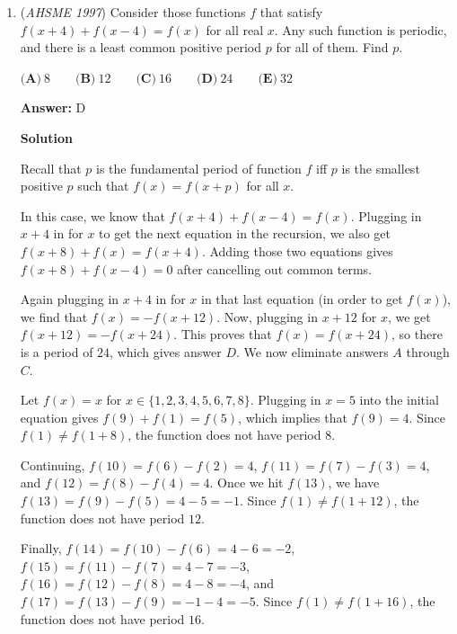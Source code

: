 \begin{enumerate}
\textbf{Solution 2}

Construct the angle bisector of $\angle APD,$ and let it intersect $AD$ at $E.$ From the angle bisector theorem, we have $AE=3a$ and $DE=2a$ for some $a.$ Then, note that $\angle EPD = \angle BCD = x,$ so $EPCB$ is cyclic. Then, $\frac{PD}{ED} = \frac{CD}{BD}$ or $\frac{2}{2x} = \frac{CD}{1}.$ Thus, $AD \cdot DC = 5x \cdot DC = 5,$ or $\boxed{A}.$



	\item (\textit{AHSME 1997}) Consider those functions $f$ that satisfy $f(x+4)+f(x-4) = f(x)$ for all real $x$. Any such function is periodic, and there is a least common positive period $p$ for all of them. Find $p$.


 $\textbf{(A)}\ 8\qquad\textbf{(B)}\ 12\qquad\textbf{(C)}\ 16\qquad\textbf{(D)}\ 24\qquad\textbf{(E)}\ 32$

 \textbf{Answer: }D



\textbf{Solution}

Recall that $p$ is the fundamental period of function $f$ iff $p$ is the smallest positive $p$ such that $f(x) = f(x + p)$ for all $x$.

 
In this case, we know that $f(x+ 4) + f(x - 4) = f(x)$.  Plugging in $x+4$ in for $x$ to get the next equation in the recursion, we also get $f(x + 8) + f(x) = f(x + 4)$.  Adding those two equations gives $f(x + 8) +  f(x - 4) = 0$ after cancelling out common terms.

 
Again plugging in $x + 4$ in for $x$ in that last equation (in order to get $f(x)$), we find that $f(x) = -f(x + 12)$.  Now, plugging in $x+12$ for $x$, we get $f(x + 12) = -f(x + 24)$.  This proves that $f(x)  = f(x + 24)$, so there is a period of $24$, which gives answer $\boxed{D}$.  We now eliminate answers $A$ through $C$.

 
Let $f(x) = x$ for $x \in \{1, 2, 3, 4, 5, 6, 7, 8\}$.  Plugging in $x=5$ into the initial equation gives $f(9) + f(1) = f(5)$, which implies that $f(9) = 4$.  Since $f(1) \neq f(1 + 8)$, the function does not have period $8$.

 Continuing, $f(10) = f(6) - f(2) = 4$, $f(11) = f(7) - f(3) = 4$, and $f(12) = f(8) - f(4) = 4$.  Once we hit $f(13)$, we have $f(13) = f(9) - f(5) = 4 - 5 = -1$.  Since $f(1) \neq f(1 + 12)$, the function does not have period $12$.

 Finally, $f(14) = f(10) - f(6) = 4 - 6 = -2$, $f(15) = f(11) - f(7) = 4 - 7 = -3$, $f(16) = f(12) - f(8) = 4 - 8 = -4$, and $f(17) = f(13) - f(9) = -1 - 4 = -5$.  Since $f(1) \neq f(1 + 16)$, the function does not have period $16$.


\end{enumerate}
